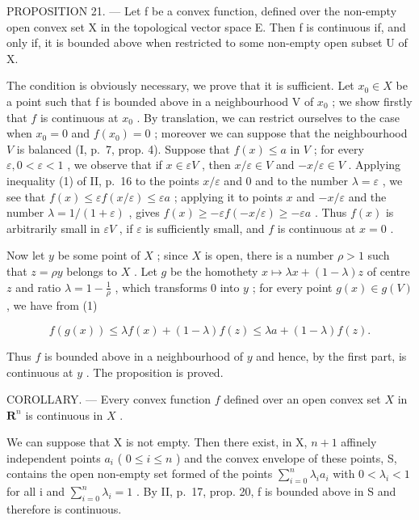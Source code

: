 PROPOSITION 21. --- Let f be a convex function, defined over the non-empty open convex set X in the topological vector space E. Then f is continuous if, and only if, it is bounded above when restricted to some non-empty open subset U of X.

The condition is obviously necessary, we prove that it is sufficient. Let \(x_{0} \in X\) be a point such that f is bounded above in a neighbourhood V of \(x_{0}\) ; we show firstly that \(f\) is continuous at \(x_0\) . By translation, we can restrict ourselves to the case when \(x_0 = 0\) and \(f(x_0) = 0\) ; moreover we can suppose that the neighbourhood \(V\) is balanced (I, p.~7, prop. 4). Suppose that \(f(x) \leqslant a\) in \(V\) ; for every \(\varepsilon, 0 < \varepsilon < 1\) , we observe that if \(x \in \varepsilon V\) , then \(x / \varepsilon \in V\) and \(-x / \varepsilon \in V\) . Applying inequality (1) of II, p.~16 to the points \(x / \varepsilon\) and 0 and to the number \(\lambda = \varepsilon\) , we see that \(f(x) \leqslant \varepsilon f(x / \varepsilon) \leqslant \varepsilon a\) ; applying it to points \(x\) and \(-x / \varepsilon\) and the number \(\lambda = 1 / (1 + \varepsilon)\) , gives \(f(x) \geqslant -\varepsilon f(-x / \varepsilon) \geqslant -\varepsilon a\) . Thus \(f(x)\) is arbitrarily small in \(\varepsilon V\) , if \(\varepsilon\) is sufficiently small, and \(f\) is continuous at \(x = 0\) .

Now let \(y\) be some point of \(X\) ; since \(X\) is open, there is a number \(\rho > 1\) such that \(z = \rho y\) belongs to \(X\) . Let \(g\) be the homothety \(x \mapsto \lambda x + (1 - \lambda)z\) of centre \(z\) and ratio \(\lambda = 1 - \frac{1}{\rho}\) , which transforms 0 into \(y\) ; for every point \(g(x) \in g(V)\) , we have from (1)

\[
f (g (x)) \leqslant \lambda f (x) + (1 - \lambda) f (z) \leqslant \lambda a + (1 - \lambda) f (z).
\]

Thus \(f\) is bounded above in a neighbourhood of \(y\) and hence, by the first part, is continuous at \(y\) . The proposition is proved.

COROLLARY. --- Every convex function \(f\) defined over an open convex set \(X\) in \(\mathbf{R}^n\) is continuous in \(X\) .

We can suppose that X is not empty. Then there exist, in X, \(n + 1\) affinely independent points \(a_{i}\) ( \(0 \leqslant i \leqslant n\) ) and the convex envelope of these points, S, contains the open non-empty set formed of the points \(\sum_{i=0}^{n} \lambda_{i} a_{i}\) with \(0 < \lambda_{i} < 1\) for all i and \(\sum_{i=0}^{n} \lambda_{i} = 1\) . By II, p.~17, prop. 20, f is bounded above in S and therefore is continuous.

